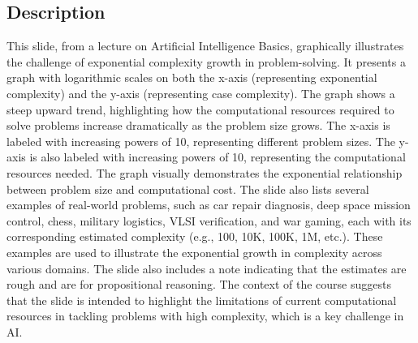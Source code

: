 \documentclass{article}%
\begin{document}
\subsection{Description}%
This slide, from a lecture on Artificial Intelligence Basics, graphically illustrates the challenge of exponential complexity growth in problem-solving.  It presents a graph with logarithmic scales on both the x-axis (representing exponential complexity) and the y-axis (representing case complexity).  The graph shows a steep upward trend, highlighting how the computational resources required to solve problems increase dramatically as the problem size grows.  The x-axis is labeled with increasing powers of 10, representing different problem sizes.  The y-axis is also labeled with increasing powers of 10, representing the computational resources needed.  The graph visually demonstrates the exponential relationship between problem size and computational cost.  The slide also lists several examples of real-world problems, such as car repair diagnosis, deep space mission control, chess, military logistics, VLSI verification, and war gaming, each with its corresponding estimated complexity (e.g., 100, 10K, 100K, 1M, etc.).  These examples are used to illustrate the exponential growth in complexity across various domains.  The slide also includes a note indicating that the estimates are rough and are for propositional reasoning.  The context of the course suggests that the slide is intended to highlight the limitations of current computational resources in tackling problems with high complexity, which is a key challenge in AI.%
\end{document}
